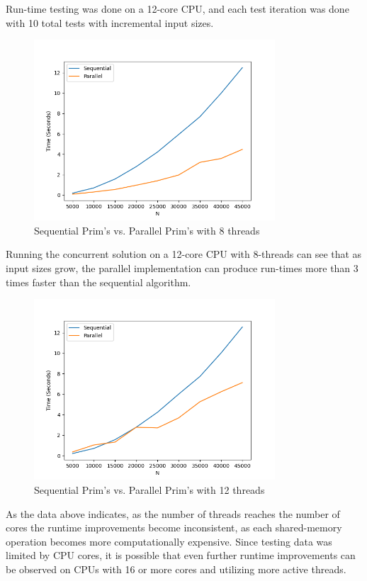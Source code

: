 \documentclass[conference]{IEEEtran}
\begin{document}
Run-time testing was done on a 12-core CPU, and each test iteration was done with 10 total tests with incremental input sizes.

\begin{figure}[h]
    \includegraphics[width=9cm]{report/images/benchprim8.png}
    \caption{Sequential Prim's vs. Parallel Prim's with 8 threads}
    \label{fig:prim_8_comparison}
\end{figure}
Running the concurrent solution on a 12-core CPU with 8-threads can see that as input sizes grow, the parallel implementation can produce run-times more than 3 times faster than the sequential algorithm.
\begin{figure}[h]
    \includegraphics[width=9cm]{report/images/benchprim12.png}
    \caption{Sequential Prim's vs. Parallel Prim's with 12 threads}
    \label{fig:prim_8_comparison}
\end{figure}
As the data above indicates, as the number of threads reaches the number of cores the runtime improvements become inconsistent, as each shared-memory operation becomes more computationally expensive. Since testing data was limited by CPU cores, it is possible that even further runtime improvements can be observed on CPUs with 16 or more cores and utilizing more active threads.
\end{document}
